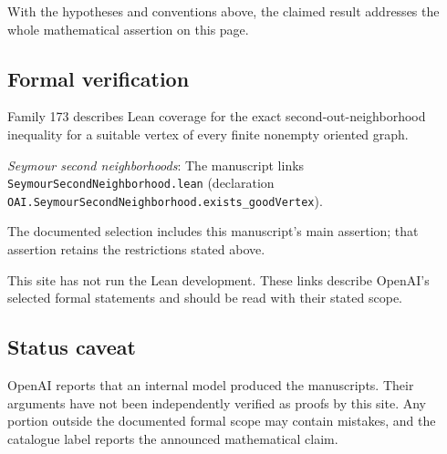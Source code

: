 \documentclass[11pt]{article}
\begin{document}
With the hypotheses and conventions above, the claimed result addresses the whole mathematical assertion on this page.

\subsection{Formal verification}
Family 173 describes Lean coverage for the exact second-out-neighborhood inequality for a suitable vertex of every finite nonempty oriented graph.

\textit{Seymour second neighborhoods}: The manuscript links \texttt{SeymourSecondNeighborhood.lean} (declaration \texttt{OAI.SeymourSecondNeighborhood.exists\_goodVertex}).

The documented selection includes this manuscript’s main assertion; that assertion retains the restrictions stated above.

This site has not run the Lean development. These links describe OpenAI’s selected formal statements and should be read with their stated scope.

\subsection{Status caveat}
OpenAI reports that an internal model produced the manuscripts. Their arguments have not been independently verified as proofs by this site. Any portion outside the documented formal scope may contain mistakes, and the catalogue label reports the announced mathematical claim.
\end{document}
